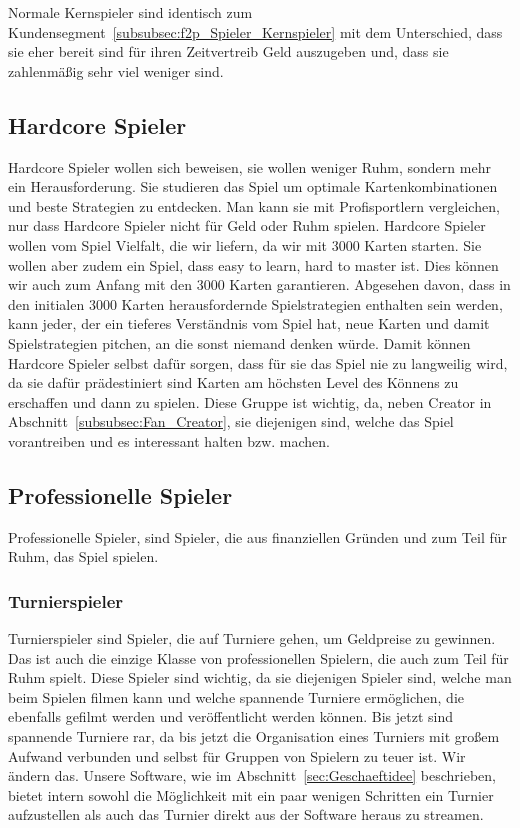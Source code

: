 \documentclass[fontsize=12, a4aper]{scrartcl}
\begin{document}
Normale Kernspieler sind identisch zum Kundensegment~\ref{subsubsec:f2p_Spieler_Kernspieler} mit dem Unterschied, dass sie eher bereit sind für ihren Zeitvertreib Geld auszugeben und, dass sie zahlenmäßig sehr viel weniger sind.

\subsection{Hardcore Spieler} \label{subsec:Hardcore_Spieler}

Hardcore Spieler wollen sich beweisen, sie wollen weniger Ruhm, sondern mehr ein Herausforderung. Sie studieren das Spiel um optimale Kartenkombinationen und beste Strategien zu entdecken. Man kann sie mit Profisportlern vergleichen, nur dass Hardcore Spieler nicht für Geld oder Ruhm spielen. Hardcore Spieler wollen vom Spiel Vielfalt, die wir liefern, da wir mit 3000 Karten starten. Sie wollen aber zudem ein Spiel, dass \glqq easy to learn, hard to master\grqq{} ist. Dies können wir auch zum Anfang mit den 3000 Karten garantieren. Abgesehen davon, dass in den initialen 3000 Karten herausfordernde Spielstrategien enthalten sein werden, kann jeder, der ein tieferes Verständnis vom Spiel hat, neue Karten und damit Spielstrategien pitchen, an die sonst niemand denken würde. Damit können Hardcore Spieler selbst dafür sorgen, dass für sie das Spiel nie zu langweilig wird, da sie dafür prädestiniert sind Karten am höchsten Level des Könnens zu erschaffen und dann zu spielen. Diese Gruppe ist wichtig, da, neben \glqq Creator\grqq{} in Abschnitt~\ref{subsubsec:Fan_Creator}, sie diejenigen sind, welche das Spiel vorantreiben und es interessant halten bzw. machen.

\subsection{Professionelle Spieler}

Professionelle Spieler, sind Spieler, die aus finanziellen Gründen und zum Teil für Ruhm, das Spiel spielen.

\subsubsection{Turnierspieler} \label{subsubsec:Professioneller_Spieler_Turnierspieler}

Turnierspieler sind Spieler, die auf Turniere gehen, um Geldpreise zu gewinnen. Das ist auch die einzige Klasse von professionellen Spielern, die auch zum Teil für Ruhm spielt. Diese Spieler sind wichtig, da sie diejenigen Spieler sind, welche man beim Spielen filmen kann und welche spannende Turniere ermöglichen, die ebenfalls gefilmt werden und veröffentlicht werden können. Bis jetzt sind spannende Turniere rar, da bis jetzt die Organisation eines Turniers mit großem Aufwand verbunden und selbst für Gruppen von Spielern zu teuer ist. Wir ändern das. Unsere Software, wie im Abschnitt~\ref{sec:Geschaeftidee} beschrieben, bietet intern sowohl die Möglichkeit mit ein paar wenigen Schritten ein Turnier aufzustellen als auch das Turnier direkt aus der Software heraus zu streamen.
\end{document}
